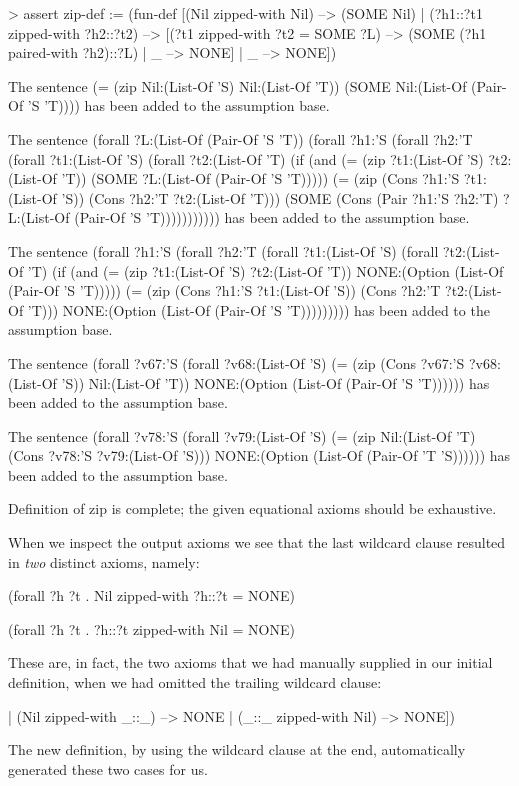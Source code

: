 \begin{tcAthena}  
> assert zip-def  := 
    (fun-def [(Nil zipped-with Nil) --> (SOME Nil)
            | (?h1::?t1 zipped-with ?h2::?t2) -->
                  [(?t1 zipped-with ?t2 = SOME ?L) --> (SOME (?h1 paired-with ?h2)::?L)
                 | _ --> NONE]
            | _ --> NONE])

The sentence 
(= (zip Nil:(List-Of 'S)
        Nil:(List-Of 'T))
   (SOME Nil:(List-Of (Pair-Of 'S 'T))))
has been added to the assumption base.

The sentence 
(forall ?L:(List-Of (Pair-Of 'S 'T))
  (forall ?h1:'S
    (forall ?h2:'T
      (forall ?t1:(List-Of 'S)
        (forall ?t2:(List-Of 'T)
          (if (and (= (zip ?t1:(List-Of 'S)
                           ?t2:(List-Of 'T))
                      (SOME ?L:(List-Of (Pair-Of 'S 'T)))))
              (= (zip (Cons ?h1:'S
                            ?t1:(List-Of 'S))
                      (Cons ?h2:'T
                            ?t2:(List-Of 'T)))
                 (SOME (Cons (Pair ?h1:'S ?h2:'T)
                             ?L:(List-Of (Pair-Of 'S 'T)))))))))))
has been added to the assumption base.

The sentence 
(forall ?h1:'S
  (forall ?h2:'T
    (forall ?t1:(List-Of 'S)
      (forall ?t2:(List-Of 'T)
        (if (and (= (zip ?t1:(List-Of 'S)
                         ?t2:(List-Of 'T))
                    NONE:(Option (List-Of (Pair-Of 'S 'T)))))
            (= (zip (Cons ?h1:'S
                          ?t1:(List-Of 'S))
                    (Cons ?h2:'T
                          ?t2:(List-Of 'T)))
               NONE:(Option (List-Of (Pair-Of 'S 'T)))))))))
has been added to the assumption base.

The sentence 
(forall ?v67:'S
  (forall ?v68:(List-Of 'S)
    (= (zip (Cons ?v67:'S
                  ?v68:(List-Of 'S))
            Nil:(List-Of 'T))
       NONE:(Option (List-Of (Pair-Of 'S 'T))))))
has been added to the assumption base.

The sentence 
(forall ?v78:'S
  (forall ?v79:(List-Of 'S)
    (= (zip Nil:(List-Of 'T)
            (Cons ?v78:'S
                  ?v79:(List-Of 'S)))
       NONE:(Option (List-Of (Pair-Of 'T 'S))))))
has been added to the assumption base.

Definition of zip is complete; the given equational axioms should be exhaustive.
\end{tcAthena}
When we inspect the output axioms
we see that the last wildcard clause 
resulted in {\em two\/} distinct axioms, namely: 
\begin{tcAthena}
(forall ?h ?t . Nil zipped-with ?h::?t = NONE)

(forall ?h ?t . ?h::?t zipped-with Nil = NONE)
\end{tcAthena}
These are, in fact, the two axioms that we had manually supplied in our initial
definition, when we had omitted the trailing wildcard clause: 
\begin{tcAthena}
            | (Nil zipped-with _::_) --> NONE
            | (_::_ zipped-with Nil) --> NONE])
\end{tcAthena}
The new definition, by using the wildcard clause at the end, 
automatically generated these two cases for us. 


